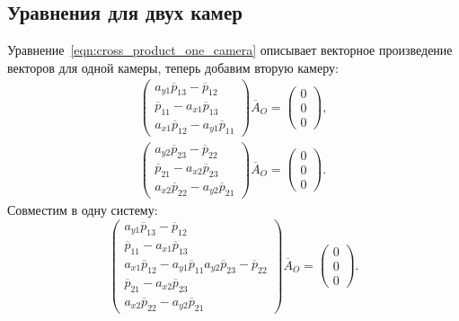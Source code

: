 \documentclass[14pt, a4paper]{extarticle}
\begin{document}
\subsection{Уравнения для двух камер}
\label{sec:two-cameras-eq}
Уравнение~\ref{eqn:cross_product_one_camera} описывает векторное
произведение векторов для одной камеры, теперь добавим вторую камеру:
\begin{equation}
\begin{gathered}
    \begin{pmatrix}
        a_{y1} \overline{p}_{13} - \overline{p}_{12} \\
        \overline{p}_{11} - a_{x1} \overline{p}_{13} \\
        a_{x1} \overline{p}_{12} - a_{y1} \overline{p}_{11}
    \end{pmatrix} \overline{A}_O = \begin{pmatrix}
        0\\
        0\\
        0
    \end{pmatrix}, \\
    \begin{pmatrix}
        a_{y2} \overline{p}_{23} - \overline{p}_{22} \\
        \overline{p}_{21} - a_{x2} \overline{p}_{23} \\
        a_{x2} \overline{p}_{22} - a_{y2} \overline{p}_{21}
    \end{pmatrix} \overline{A}_O = \begin{pmatrix}
        0\\
        0\\
        0
    \end{pmatrix}.
\end{gathered}
\label{eqn:two_cameras_cross_separate}
\end{equation}
Совместим в одну систему:
\begin{equation}
    \begin{pmatrix}
        a_{y1} \overline{p}_{13} - \overline{p}_{12} \\
        \overline{p}_{11} - a_{x1} \overline{p}_{13} \\
        a_{x1} \overline{p}_{12} - a_{y1} \overline{p}_{11}
        a_{y2} \overline{p}_{23} - \overline{p}_{22} \\
        \overline{p}_{21} - a_{x2} \overline{p}_{23} \\
        a_{x2} \overline{p}_{22} - a_{y2} \overline{p}_{21}
    \end{pmatrix} \overline{A}_O = \begin{pmatrix}
        0\\
        0\\
        0
    \end{pmatrix}.
\label{eqn:two_cameras_cross_joined}
\end{equation}
\end{document}
